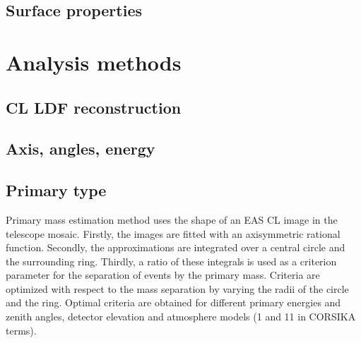 \documentclass[a4paper,11pt]{article}
\begin{document}

\subsection{Surface properties}


\section{Analysis methods}
\subsection{CL LDF reconstruction}

\subsection{Axis, angles, energy}
\subsection{Primary type}


Primary mass estimation method uses the shape of an EAS CL image in the telescope mosaic. Firstly, the images are fitted with an axisymmetric rational function. Secondly, the approximations are integrated over a central circle and the surrounding ring. Thirdly, a ratio of these integrals is used as a criterion parameter for the separation of events by the primary mass. Criteria are optimized with respect to the mass separation by varying the radii of the circle and the ring. Optimal criteria are obtained for different primary energies and zenith angles, detector elevation and atmosphere models (1 and 11 in CORSIKA terms).
\end{document}
